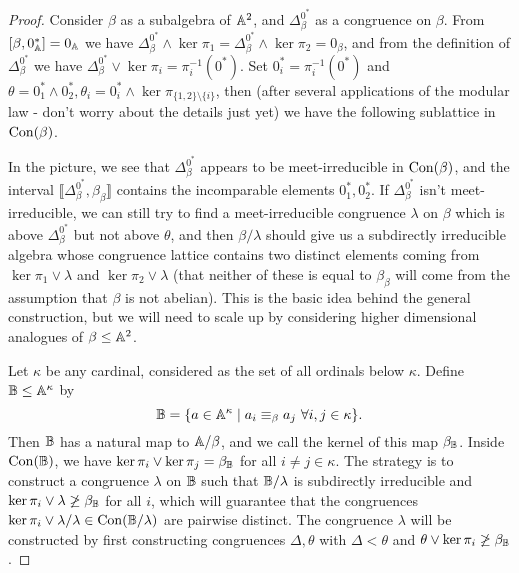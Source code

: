 \begin{appendices}
\begin{proof}
Consider $\beta$ as a subalgebra of $\mathbb{A}^2$, and $\Delta_\beta^{0^*}$ as a congruence on $\beta$. From $[\beta,0_{\mathbb{A}}^*] = 0_{\mathbb{A}}$ we have $\Delta_\beta^{0^*} \wedge \ker \pi_1 = \Delta_\beta^{0^*} \wedge \ker \pi_2 = 0_\beta$, and from the definition of $\Delta_\beta^{0^*}$ we have $\Delta_\beta^{0^*} \vee \ker \pi_i = \pi_i^{-1}(0^*)$. Set $0^*_i = \pi_i^{-1}(0^*)$ and $\theta = 0^*_1 \wedge 0^*_2, \theta_i = 0^*_i \wedge \ker \pi_{\{1,2\}\setminus \{i\}}$, then (after several applications of the modular law - don't worry about the details just yet) we have the following sublattice in $\operatorname{Con}(\beta)$.
\begin{center}
\end{center}
In the picture, we see that $\Delta_\beta^{0^*}$ appears to be meet-irreducible in $\operatorname{Con}(\beta)$, and the interval $\llbracket \Delta_\beta^{0^*}, \beta_\beta\rrbracket$ contains the incomparable elements $0^*_1, 0^*_2$. If $\Delta_\beta^{0^*}$ isn't meet-irreducible, we can still try to find a meet-irreducible congruence $\lambda$ on $\beta$ which is above $\Delta_\beta^{0^*}$ but not above $\theta$, and then $\beta/\lambda$ should give us a subdirectly irreducible algebra whose congruence lattice contains two distinct elements coming from $\ker \pi_1 \vee \lambda$ and $\ker \pi_2 \vee \lambda$ (that neither of these is equal to $\beta_\beta$ will come from the assumption that $\beta$ is not abelian). This is the basic idea behind the general construction, but we will need to scale up by considering higher dimensional analogues of $\beta \le \mathbb{A}^2$.

Let $\kappa$ be any cardinal, considered as the set of all ordinals below $\kappa$. Define $\mathbb{B} \le \mathbb{A}^\kappa$ by
\[
\mathbb{B} = \{a \in \mathbb{A}^\kappa \mid a_i \equiv_\beta a_j\ \forall i,j \in \kappa\}.
\]
Then $\mathbb{B}$ has a natural map to $\mathbb{A}/\beta$, and we call the kernel of this map $\beta_{\mathbb{B}}$. Inside $\operatorname{Con}(\mathbb{B})$, we have $\ker \pi_i \vee \ker \pi_j = \beta_{\mathbb{B}}$ for all $i \ne j \in \kappa$. The strategy is to construct a congruence $\lambda$ on $\mathbb{B}$ such that $\mathbb{B}/\lambda$ is subdirectly irreducible and $\ker \pi_i \vee \lambda \not\ge \beta_{\mathbb{B}}$ for all $i$, which will guarantee that the congruences $\ker \pi_i \vee \lambda/\lambda \in \operatorname{Con}(\mathbb{B}/\lambda)$ are pairwise distinct. The congruence $\lambda$ will be constructed by first constructing congruences $\Delta, \theta$ with $\Delta < \theta$ and $\theta \vee \ker \pi_i \not\ge \beta_{\mathbb{B}}$.


\end{proof}
\end{appendices}
